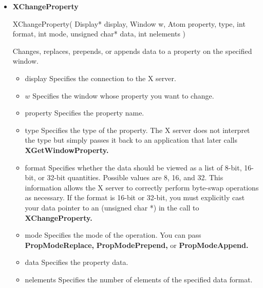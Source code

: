 \documentclass{report}
\begin{document}
\begin{itemize}
\begin{cppcode}
{                    event.xclient.type = ClientMessage;
                    event.xclient.window = win;
                    event.xclient.message_type = wm_protocols;
                    event.xclient.format = 32;
                    event.xclient.data.l[0] = atom;
                    event.xclient.data.l[1] = time != (Time)NULL ? time : CurrentTime;

                    XSendEvent(dp, win, false, NoEventMask, &event);
                }
            \end{cppcode}
        \item \textbf{XChangeProperty}
            \bigbreak \noindent 
            \begin{cppcode}
            XChangeProperty(
                Display* display,
                Window w,
                Atom property, type,
                int format,
                int mode,
                unsigned char* data,
                int nelements
            )
            \end{cppcode}
            \bigbreak \noindent
            Changes, replaces, prepends, or appends data to a property on the specified window.
            \begin{itemize}
                \item display Specifies the connection to the X server.
                \item $w$ Specifies the window whose property you want to change.
                \item property Specifies the property name.
                \item type Specifies the type of the property. The X server does not interpret the type but simply passes it back to an application that later calls \textbf{XGetWindowProperty.}
                \item format Specifies whether the data should be viewed as a list of 8-bit, 16-bit, or 32-bit quantities. Possible values are 8, 16, and 32. This information allows the X server to correctly perform byte-swap operations as necessary. If the format is 16-bit or 32-bit, you must explicitly cast your data pointer to an (unsigned char *) in the call to \textbf{XChangeProperty.}
                \item mode Specifies the mode of the operation. You can pass \textbf{PropModeReplace,} \textbf{PropModePrepend,} or \textbf{PropModeAppend.}
                \item data Specifies the property data.
                \item nelements Specifies the number of elements of the specified data format.

\end{itemize}
\end{itemize}
\end{document}

